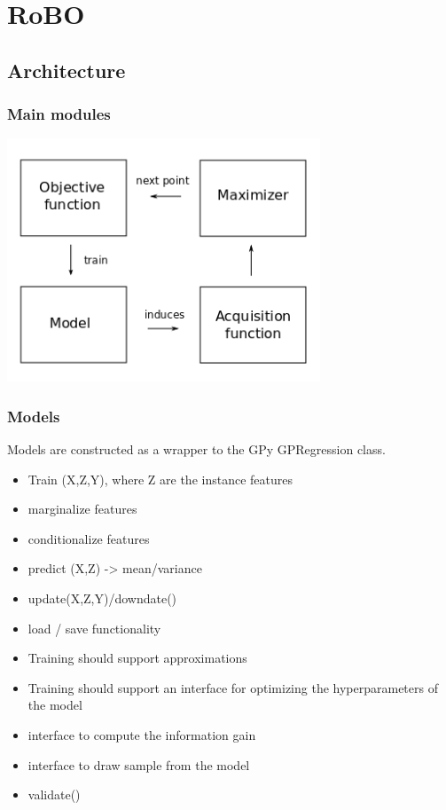 \documentclass[10pt,handout]{beamer}
\begin{document}
\section{RoBO}

\subsection{Architecture}

\begin{frame}
\frametitle{Main modules}

\begin{center}
\includegraphics[width=0.7\textwidth]{robo_framework.png}
\end{center}


\end{frame}

\begin{frame}
\frametitle{Models}

Models are constructed as a wrapper to the GPy GPRegression class.

\begin{itemize}
\item Train (X,Z,Y), where Z are the instance features
\item marginalize features
\item conditionalize features
\item predict (X,Z) -> mean/variance
\item update(X,Z,Y)/downdate()
\item load / save functionality
\item Training should support approximations
\item Training should support an interface for optimizing the hyperparameters of the model
\item interface to compute the information gain
\item interface to draw sample from the model
\item validate()
\end{itemize}

\end{frame}
\end{document}
